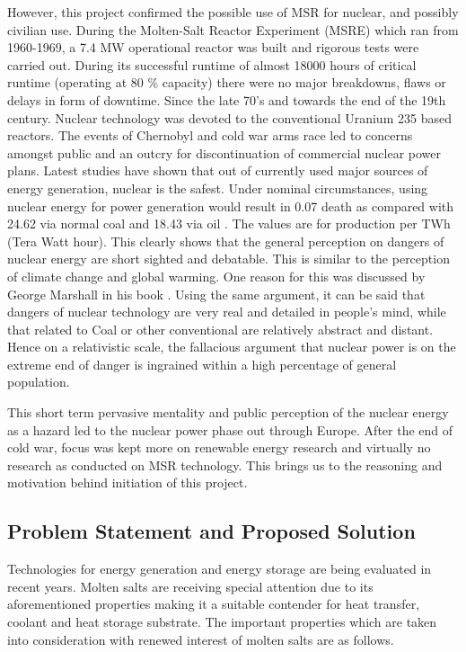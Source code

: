 However, this project confirmed the possible use of MSR for nuclear, and possibly civilian use. During the Molten-Salt Reactor Experiment (MSRE) which ran from 1960-1969, a 7.4 MW operational reactor was built and rigorous tests were carried out. During its successful runtime of almost 18000 hours of critical runtime (operating at 80 \% capacity) there were no major breakdowns, flaws or delays in form of downtime. \newline 
Since the late 70’s and towards the end of the 19th century. Nuclear technology was devoted to the conventional Uranium 235 based reactors. The events of Chernobyl and cold war arms race led to concerns amongst public and an outcry for discontinuation of commercial nuclear power plans. Latest studies have shown that out of currently used major sources of energy generation, nuclear is the safest. Under nominal circumstances, using nuclear energy for power generation would result in 0.07 death as compared with 24.62 via normal coal and 18.43 via oil \cite{markandya2007a}. The values are for production per TWh (Tera Watt hour). This clearly shows that the general perception on dangers of nuclear energy are short sighted and debatable. This is similar to the perception of climate change and global warming. One reason for this was discussed by George Marshall in his book \cite{marshall-g}. Using the same argument, it can be said that dangers of nuclear technology are very real and detailed in people’s mind, while that related to Coal or other conventional are relatively abstract and distant. Hence on a relativistic scale, the fallacious argument that nuclear power is on the extreme end of danger is ingrained within a high percentage of general population. \newline 


This short term pervasive mentality and public perception of the nuclear energy as a hazard led to the nuclear power phase out through Europe. After the end of cold war, focus was kept more on renewable energy research and virtually no research as conducted on MSR technology. This brings us to the reasoning and motivation behind initiation of this project.  \newline 

\subsection{Problem Statement and Proposed Solution}

Technologies for energy generation and energy storage are being evaluated in recent years. Molten salts are receiving special attention due to its aforementioned properties making it a suitable contender for heat transfer, coolant and heat storage substrate\cite{nunes2016a}\cite{serrano-2013a}. The important properties which are taken into consideration with renewed interest of molten salts are as follows.

